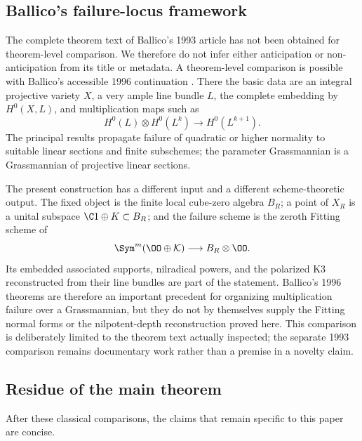 \subsection{Ballico's failure-locus framework}

The complete theorem text of Ballico's 1993 article
\cite{Ballico93} has not been obtained for theorem-level comparison.  We therefore do
not infer either anticipation or non-anticipation from its title or
metadata.  A theorem-level comparison is possible with Ballico's
accessible 1996 continuation \cite{Ballico96}.  There the basic data
are an integral projective variety $X$, a very ample line bundle $L$,
the complete embedding by $H^0(X,L)$, and multiplication maps such as
\[
 H^0(L)\otimes H^0(L^k)\longrightarrow H^0(L^{k+1}).
\]
The principal results propagate failure of quadratic or higher
normality to suitable linear sections and finite subschemes; the
parameter Grassmannian is a Grassmannian of projective linear
sections.

The present construction has a different input and a different
scheme-theoretic output.  The fixed object is the finite local
cube-zero algebra $B_R$; a point of $X_R$ is a unital subspace
$\C1\oplus K\subset B_R$; and the failure scheme is the zeroth Fitting
scheme of
\[
 \Sym^m(\OO\oplus\mathcal K)\longrightarrow B_R\otimes\OO.
\]
Its embedded associated supports, nilradical powers, and the
polarized K3 reconstructed from their line bundles are part of the
statement.  Ballico's 1996 theorems are therefore an important
precedent for organizing multiplication failure over a Grassmannian,
but they do not by themselves supply the Fitting normal forms or the
nilpotent-depth reconstruction proved here.  This comparison is
deliberately limited to the theorem text actually inspected; the
separate 1993 comparison remains documentary work rather than a
premise in a novelty claim.

\subsection{Residue of the main theorem}

After these classical comparisons, the claims that remain specific to
this paper are concise.

